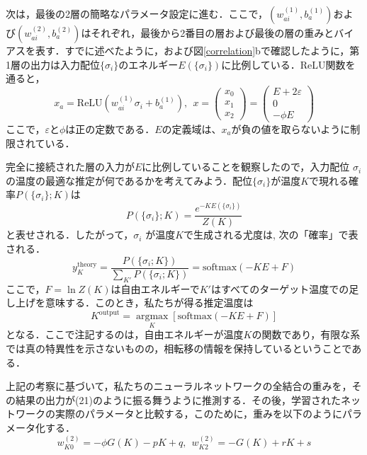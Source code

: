 \documentclass[a4paper,11pt]{jsarticle}
\begin{document}
次は，最後の2層の簡略なパラメータ設定に進む．ここで，$(w_{ai}^{(1)}, b_a^{(1)})$および$(w_{ai}^{(2)}, b_a^{(2)})$はそれぞれ，最後から2番目の層および最後の層の重みとバイアスを表す．すでに述べたように，および図\ref{correlation}bで確認したように，第1層の出力は入力配位$\{ \sigma_i \}$のエネルギー$E(\{ \sigma_i \})$に比例している．ReLU関数を通ると，
\begin{equation}
  x_a = \text{ReLU}(w_{ai}^{(1)}\sigma_i + b_a^{(1)}), \ \
  x = \begin{pmatrix} x_0 \\ x_1 \\ x_2 \end{pmatrix}
  = \begin{pmatrix} E+2\varepsilon \\ 0 \\ -\phi E \end{pmatrix}
\end{equation}
ここで，$\varepsilon$と$\phi$は正の定数である．$E$の定義域は、$x_a$が負の値を取らないように制限されている．\par
完全に接続された層の入力が$E$に比例していることを観察したので，入力配位 ${\sigma_i}$の温度の最適な推定が何であるかを考えてみよう．配位$\{ \sigma_i \}$が温度$K$で現れる確率$P(\{ \sigma_i \} ; K )$は
\begin{equation}
  P(\{ \sigma_i \} ; K ) = \frac{e^{-KE(\{ \sigma_i \})}}{Z(K)}
\end{equation}
と表せされる．したがって，${\sigma_i}$ が温度$K$で生成される尤度は,
次の「確率」で表される．
\begin{equation}
  y_K^{\text{theory}} = \frac{P(\{\sigma_i ; K \})}{\sum_{K'}P(\{\sigma_i ; K \})} = \text{softmax}(-KE + F)
\end{equation}
ここで，$F = \ln{Z(K)}$は自由エネルギーで$K'$はすべてのターゲット温度での足し上げを意味する．このとき，私たちが得る推定温度は
\begin{equation}
  K^{\text{output}} =
  \underset{K} {\operatorname{argmax}} \left[\text{softmax}(-KE + F)\right]
\end{equation}
となる．ここで注記するのは，自由エネルギーが温度$K$の関数であり，有限な系では真の特異性を示さないものの，相転移の情報を保持しているということである．\par
上記の考察に基づいて，私たちのニューラルネットワークの全結合の重みを，その結果の出力が(21)のように振る舞うように推測する．その後，学習されたネットワークの実際のパラメータと比較する，このために，重みを以下のようにパラメータ化する．
\begin{equation}
  w_{K0}^{(2)} = -\phi G(K) - pK + q, \ \
  w_{K2}^{(2)} = -G(K) + rK + s
\end{equation}
\end{document}
